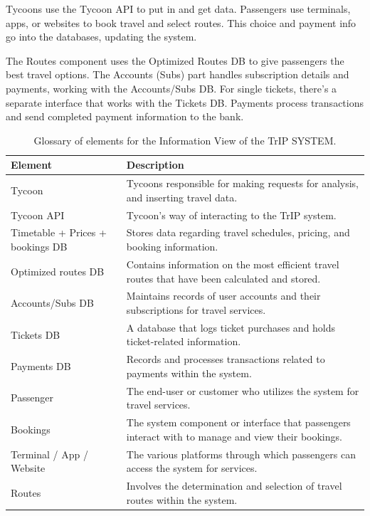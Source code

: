 Tycoons use the Tycoon API to put in and get data. Passengers use terminals, apps, or websites to book travel and select routes. This choice and payment info go into the databases, updating the system.

The Routes component uses the Optimized Routes DB to give passengers the best travel options. The Accounts (Subs) part handles subscription details and payments, working with the Accounts/Subs DB. For single tickets, there's a separate interface that works with the Tickets DB. Payments process transactions and send completed payment information to the bank.

\begin{table}[H]
    \centering
    \caption{Glossary of elements for the Information View of the TrIP SYSTEM.}
    \label{tab:information_view_glossary}
    \begin{tabularx}{\textwidth}{@{}lX@{}} %
    \toprule
    \textbf{Element} & \textbf{Description} \\
    \midrule
    Tycoon & Tycoons responsible for making requests for analysis, and inserting travel data. \\
    Tycoon API & Tycoon's way of interacting to the TrIP system. \\
    Timetable + Prices + bookings DB & Stores data regarding travel schedules, pricing, and booking information. \\
    Optimized routes DB & Contains information on the most efficient travel routes that have been calculated and stored. \\
    Accounts/Subs DB & Maintains records of user accounts and their subscriptions for travel services. \\
    Tickets DB & A database that logs ticket purchases and holds ticket-related information. \\
    Payments DB & Records and processes transactions related to payments within the system. \\
    Passenger & The end-user or customer who utilizes the system for travel services. \\
    Bookings & The system component or interface that passengers interact with to manage and view their bookings. \\
    Terminal / App / Website & The various platforms through which passengers can access the system for services. \\
    Routes & Involves the determination and selection of travel routes within the system. \\

\end{tabularx}
\end{table}
